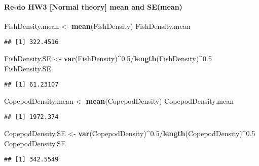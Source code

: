 \documentclass[]{article}
\newenvironment{Shaded}{\begin{snugshade}}{\end{snugshade}}
\newcommand{\KeywordTok}[1]{\textcolor[rgb]{0.13,0.29,0.53}{\textbf{{#1}}}}
\newcommand{\FloatTok}[1]{\textcolor[rgb]{0.00,0.00,0.81}{{#1}}}
\newcommand{\StringTok}[1]{\textcolor[rgb]{0.31,0.60,0.02}{{#1}}}
\newcommand{\NormalTok}[1]{{#1}}
\let\oldparagraph\paragraph
\renewcommand{\paragraph}[1]{\oldparagraph{#1}\mbox{}}
\begin{document}
\paragraph{Re-do HW3 {[}Normal theory{]} mean and
SE(mean)}\label{re-do-hw3-normal-theory-mean-and-semean}

\begin{Shaded}
\begin{Highlighting}[]
\NormalTok{FishDensity.mean <-}\StringTok{ }\KeywordTok{mean}\NormalTok{(FishDensity)}
\NormalTok{FishDensity.mean}
\end{Highlighting}
\end{Shaded}

\begin{verbatim}
## [1] 322.4516
\end{verbatim}

\begin{Shaded}
\begin{Highlighting}[]
\NormalTok{FishDensity.SE <-}\StringTok{ }\KeywordTok{var}\NormalTok{(FishDensity)^}\FloatTok{0.5}\NormalTok{/}\KeywordTok{length}\NormalTok{(FishDensity)^}\FloatTok{0.5}
\NormalTok{FishDensity.SE}
\end{Highlighting}
\end{Shaded}

\begin{verbatim}
## [1] 61.23107
\end{verbatim}

\begin{Shaded}
\begin{Highlighting}[]
\NormalTok{CopepodDensity.mean <-}\StringTok{ }\KeywordTok{mean}\NormalTok{(CopepodDensity)}
\NormalTok{CopepodDensity.mean}
\end{Highlighting}
\end{Shaded}

\begin{verbatim}
## [1] 1972.374
\end{verbatim}

\begin{Shaded}
\begin{Highlighting}[]
\NormalTok{CopepodDensity.SE <-}\StringTok{ }\KeywordTok{var}\NormalTok{(CopepodDensity)^}\FloatTok{0.5}\NormalTok{/}\KeywordTok{length}\NormalTok{(CopepodDensity)^}\FloatTok{0.5}
\NormalTok{CopepodDensity.SE}
\end{Highlighting}
\end{Shaded}

\begin{verbatim}
## [1] 342.5549
\end{verbatim}
\end{document}
